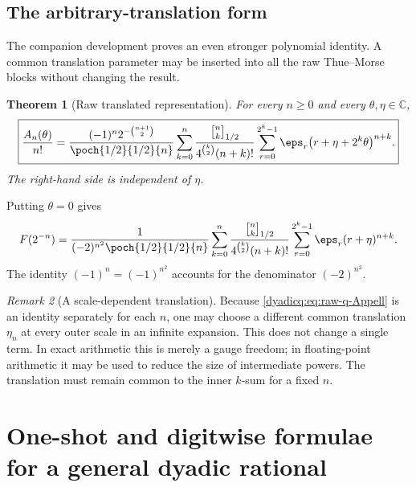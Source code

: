 \documentclass[11pt,oneside]{article}
\newtheorem{theorem}{Theorem}[section]
\theoremstyle{definition}
\theoremstyle{remark}
\newtheorem{remark}[theorem]{Remark}
\newcommand{\C}{\mathbb C}
\newcommand{\qbinom}[3]{\genfrac{[}{]}{0pt}{}{#1}{#2}_{#3}}
\begin{document}
\subsection{The arbitrary-translation form}

The companion development proves an even stronger polynomial identity.  A
common translation parameter may be inserted into all the raw Thue--Morse
blocks without changing the result.

\begin{theorem}[Raw translated representation]\label{dyadicq:thm:raw-q-Appell}
For every $n\ge0$ and every $\theta,\eta\in\C$,
\begin{equation}\label{dyadicq:eq:raw-q-Appell}
\boxed{
 \frac{A_n(\theta)}{n!}
 =\frac{(-1)^n2^{-\binom{n+1}{2}}}{\poch{1/2}{1/2}{n}}
 \sum_{k=0}^{n}
 \frac{\qbinom{n}{k}{1/2}}
 {4^{\binom k2}(n+k)!}
 \sum_{r=0}^{2^k-1}
 \eps_r\bigl(r+\eta+2^k\theta\bigr)^{n+k}.}
\end{equation}
The right-hand side is independent of $\eta$.
\end{theorem}

Putting $\theta=0$ gives
\begin{equation}\label{dyadicq:eq:raw-inverse-dyadic}
 F(2^{-n})
 =\frac1{(-2)^{n^2}\poch{1/2}{1/2}{n}}
 \sum_{k=0}^{n}
 \frac{\qbinom{n}{k}{1/2}}
 {4^{\binom k2}(n+k)!}
 \sum_{r=0}^{2^k-1}\eps_r(r+\eta)^{n+k}.
\end{equation}
The identity $(-1)^n=(-1)^{n^2}$ accounts for the denominator
$(-2)^{n^2}$.

\begin{remark}[A scale-dependent translation]
Because \eqref{dyadicq:eq:raw-q-Appell} is an identity separately for each $n$, one
may choose a different common translation $\eta_n$ at every outer scale in an
infinite expansion.  This does not change a single term.  In exact arithmetic
this is merely a gauge freedom; in floating-point arithmetic it may be used to
reduce the size of intermediate powers.  The translation must remain common
to the inner $k$-sum for a fixed $n$.
\end{remark}


\section{One-shot and digitwise formulae for a general dyadic rational}
\end{document}
